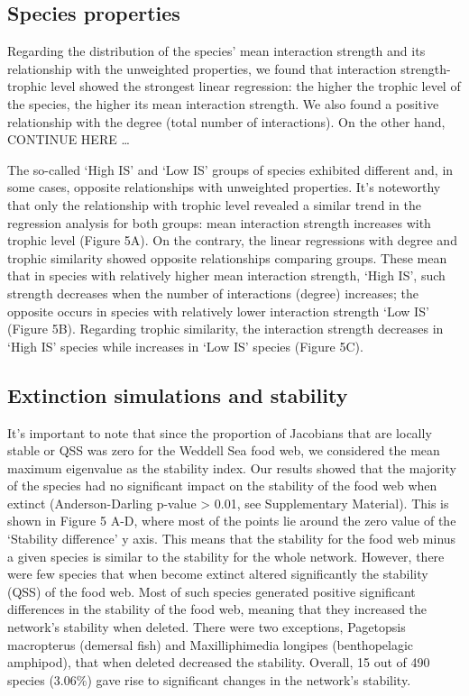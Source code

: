 \documentclass[gc, manuscript]{copernicus}
\begin{document}
\subsection{Species properties}

Regarding the distribution of the species' mean interaction strength and
its relationship with the unweighted properties, we found that
interaction strength-trophic level showed the strongest linear
regression: the higher the trophic level of the species, the higher its
mean interaction strength. We also found a positive relationship with
the degree (total number of interactions). On the other hand, CONTINUE
HERE \ldots{}

The so-called `High IS' and `Low IS' groups of species exhibited
different and, in some cases, opposite relationships with unweighted
properties. It's noteworthy that only the relationship with trophic
level revealed a similar trend in the regression analysis for both
groups: mean interaction strength increases with trophic level (Figure
5A). On the contrary, the linear regressions with degree and trophic
similarity showed opposite relationships comparing groups. These mean
that in species with relatively higher mean interaction strength, `High
IS', such strength decreases when the number of interactions (degree)
increases; the opposite occurs in species with relatively lower
interaction strength `Low IS' (Figure 5B). Regarding trophic similarity,
the interaction strength decreases in `High IS' species while increases
in `Low IS' species (Figure 5C).

\subsection{Extinction simulations and stability}

It's important to note that since the proportion of Jacobians that are
locally stable or QSS was zero for the Weddell Sea food web, we
considered the mean maximum eigenvalue as the stability index. Our
results showed that the majority of the species had no significant
impact on the stability of the food web when extinct (Anderson-Darling
p-value \textgreater{} 0.01, see Supplementary Material). This is shown
in Figure 5 A-D, where most of the points lie around the zero value of
the `Stability difference' y axis. This means that the stability for the
food web minus a given species is similar to the stability for the whole
network. However, there were few species that when become extinct
altered significantly the stability (QSS) of the food web. Most of such
species generated positive significant differences in the stability of
the food web, meaning that they increased the network's stability when
deleted. There were two exceptions, Pagetopsis macropterus (demersal
fish) and Maxilliphimedia longipes (benthopelagic amphipod), that when
deleted decreased the stability. Overall, 15 out of 490 species (3.06\%)
gave rise to significant changes in the network's stability.
\end{document}

